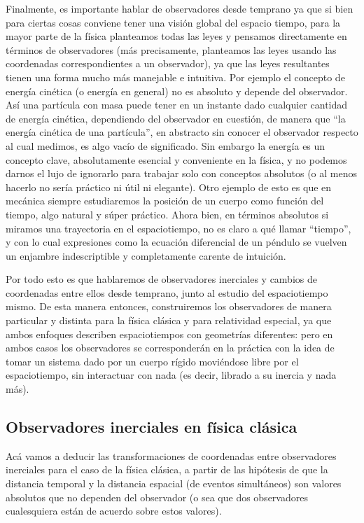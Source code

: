 \documentclass{article}
\begin{document}
Finalmente, es importante hablar de observadores desde temprano ya que si bien para ciertas cosas conviene tener una visión
global del espacio tiempo, para la mayor parte de la física planteamos todas las leyes y pensamos directamente en términos
de observadores (más precisamente, planteamos las leyes usando las coordenadas correspondientes a un observador),
ya que las leyes resultantes tienen una forma mucho más manejable e intuitiva. Por ejemplo el concepto de energía cinética
(o energía en general) no es absoluto y depende del observador. Así una partícula con masa puede tener en un instante dado
cualquier cantidad de energía cinética, dependiendo del observador en cuestión, de manera que ``la energía cinética de una
partícula'', en abstracto sin conocer el observador respecto al cual medimos, es algo vacío de significado. Sin embargo
la energía es un concepto clave, absolutamente esencial y conveniente en la física, y no podemos darnos el lujo de ignorarlo para
trabajar solo con conceptos absolutos (o al menos hacerlo no sería práctico ni útil ni elegante). Otro ejemplo de esto
es que en mecánica siempre estudiaremos la posición de un cuerpo como función del tiempo, algo natural y súper práctico.
Ahora bien, en términos absolutos si miramos una trayectoria en el espaciotiempo, no es claro a qué llamar ``tiempo'',
y con lo cual expresiones como la ecuación diferencial de un péndulo se vuelven un enjambre indescriptible y completamente
carente de intuición.

Por todo esto es que hablaremos de observadores inerciales y cambios de coordenadas entre ellos desde temprano, junto al
estudio del espaciotiempo mismo. De esta manera entonces, construiremos los observadores de manera particular
y distinta para la física clásica y para relatividad especial, ya que ambos enfoques describen espaciotiempos con geometrías
diferentes: pero en ambos casos los observadores se corresponderán en la práctica con la idea de tomar un sistema dado por un
cuerpo rígido moviéndose libre por el espaciotiempo, sin interactuar con nada (es decir, librado a su inercia y nada más).

\subsection{Observadores inerciales en física clásica}

Acá vamos a deducir las transformaciones de coordenadas entre observadores inerciales para el caso de la física clásica,
a partir de las hipótesis de que la distancia temporal y la distancia espacial (de eventos simultáneos) son valores
absolutos que no dependen del observador (o sea que dos observadores cualesquiera están de acuerdo sobre estos valores).
\end{document}
